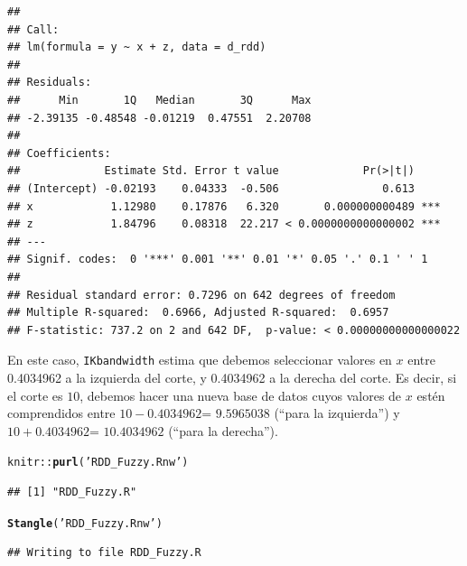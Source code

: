 \documentclass[onesided]{article}\usepackage[]{graphicx}\usepackage[]{color}
\makeatletter
\newcommand{\hlstr}[1]{\textcolor[rgb]{0.192,0.494,0.8}{#1}}%
\newcommand{\hlopt}[1]{\textcolor[rgb]{0,0,0}{#1}}%
\newcommand{\hlstd}[1]{\textcolor[rgb]{0.345,0.345,0.345}{#1}}%
\newcommand{\hlkwd}[1]{\textcolor[rgb]{0.737,0.353,0.396}{\textbf{#1}}}%
\newenvironment{kframe}{%
 \def\at@end@of@kframe{}%
 \ifinner\ifhmode%
  \def\at@end@of@kframe{\end{minipage}}%
  \begin{minipage}{\columnwidth}%
 \fi\fi%
 \def\FrameCommand##1{\hskip\@totalleftmargin \hskip-\fboxsep
 \colorbox{shadecolor}{##1}\hskip-\fboxsep
     \hskip-\linewidth \hskip-\@totalleftmargin \hskip\columnwidth}%
 \MakeFramed {\advance\hsize-\width
   \@totalleftmargin\z@ \linewidth\hsize
   \@setminipage}}%
 {\par\unskip\endMakeFramed%
 \at@end@of@kframe}
\newenvironment{knitrout}{}{} %
\makeatother
\begin{document}
\begin{knitrout}
\begin{kframe}
\begin{verbatim}
## 
## Call:
## lm(formula = y ~ x + z, data = d_rdd)
## 
## Residuals:
##      Min       1Q   Median       3Q      Max 
## -2.39135 -0.48548 -0.01219  0.47551  2.20708 
## 
## Coefficients:
##             Estimate Std. Error t value             Pr(>|t|)    
## (Intercept) -0.02193    0.04333  -0.506                0.613    
## x            1.12980    0.17876   6.320       0.000000000489 ***
## z            1.84796    0.08318  22.217 < 0.0000000000000002 ***
## ---
## Signif. codes:  0 '***' 0.001 '**' 0.01 '*' 0.05 '.' 0.1 ' ' 1
## 
## Residual standard error: 0.7296 on 642 degrees of freedom
## Multiple R-squared:  0.6966,	Adjusted R-squared:  0.6957 
## F-statistic: 737.2 on 2 and 642 DF,  p-value: < 0.00000000000000022
\end{verbatim}
\end{kframe}
\end{knitrout}

En este caso, \texttt{IKbandwidth} estima que debemos seleccionar valores en $x$ entre 0.4034962 a la izquierda del corte, y 0.4034962 a la derecha del corte. Es decir, si el corte es $10$, debemos hacer una nueva base de datos cuyos valores de $x$ est\'en comprendidos entre $10-0.4034962$= $9.5965038$ (``para la izquierda'') y $10+0.4034962$= $10.4034962$ (``para la derecha'').


\begin{knitrout}
\color{fgcolor}\begin{kframe}
\begin{alltt}
\hlstd{knitr}\hlopt{::}\hlkwd{purl}\hlstd{(}\hlstr{'RDD_Fuzzy.Rnw'}\hlstd{)}
\end{alltt}
\begin{verbatim}
## [1] "RDD_Fuzzy.R"
\end{verbatim}
\begin{alltt}
\hlkwd{Stangle}\hlstd{(}\hlstr{'RDD_Fuzzy.Rnw'}\hlstd{)}
\end{alltt}
\begin{verbatim}
## Writing to file RDD_Fuzzy.R
\end{verbatim}
\end{kframe}
\end{knitrout}

\paragraph{}
\paragraph{}
\setcounter{page}{1}
\printbibliography
\end{document}
